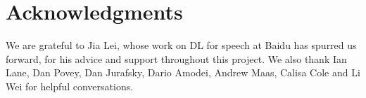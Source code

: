 \documentclass{article}
\begin{document}
\section*{Acknowledgments} 
We are grateful to Jia Lei, whose work on DL for speech at Baidu has spurred us
forward, for his advice and support throughout this project.  We also thank Ian
Lane, Dan Povey, Dan Jurafsky, Dario Amodei, Andrew Maas, Calisa Cole and Li
Wei for helpful conversations.



\end{document}
